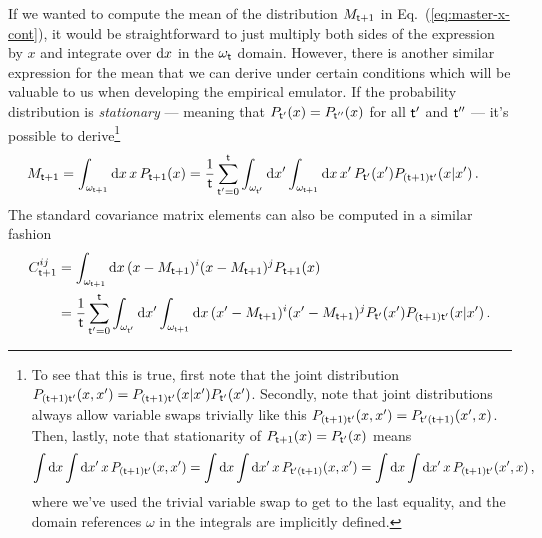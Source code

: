 If we wanted to compute the mean of the distribution $M_{{\sf t}+1}$ in Eq.~(\ref{eq:master-x-cont}), it would be straightforward to just multiply both sides of the expression by $x$ and integrate over ${\rm d}x$ in the $\omega_{{\sf t}}$ domain. However, there is another similar expression for the mean that we can derive under certain conditions which will be valuable to us when developing the empirical emulator. If the probability distribution is \emph{stationary} --- meaning that $P_{{\sf t}'}(x)=P_{{\sf t}''}(x)$ for all ${\sf t}'$ and ${\sf t}''$ --- it's possible to derive\footnote{To see that this is true, first note that the joint distribution $P_{({\sf t}+1){\sf t}'}(x,x')=P_{({\sf t}+1){\sf t}'}(x\vert x')P_{{\sf t}'}(x')$. Secondly, note that joint distributions always allow variable swaps trivially like this $P_{({\sf t}+1){\sf t}'}(x,x')=P_{{\sf t}'({\sf t}+1)}(x',x)$. Then, lastly, note that stationarity of $P_{{\sf t}+1}(x)=P_{{\sf t}'}(x)$ means 
$$\int {\rm d}x\int {\rm d}x' \, x\,P_{({\sf t}+1){\sf t}'}(x,x')=\int {\rm d}x\int {\rm d}x'  \, x\, P_{{\sf t}'({\sf t}+1)}(x,x')=\int {\rm d}x\int {\rm d}x'  \, x\, P_{({\sf t}+1){\sf t}'}(x',x)\,,$$
where we've used the trivial variable swap to get to the last equality, and the domain references $\omega$ in the integrals are implicitly defined.} 
\begin{align}
M_{{\sf t}+1} = \int_{\omega_{{\sf t}+1}}{\rm d}x \,x\,P_{{\sf t}+1}(x) &= \frac{1}{{\sf t}}\sum_{{\sf t}'=0}^{{\sf t}}\int_{\omega_{{\sf t}'}}{\rm d}x'\int_{\omega_{{\sf t}+1}}{\rm d}x \, x' \, P_{{\sf t}'}(x') P_{({\sf t}+1){\sf t}'}(x\vert x') \label{eq:stationary-mean-estimator}\,.
\end{align}
The standard covariance matrix elements can also be computed in a similar fashion
\begin{align}
C^{ij}_{{\sf t}+1} &= \int_{\omega_{{\sf t}+1}}{\rm d}x \,(x-M_{{\sf t}+1})^i(x-M_{{\sf t}+1})^jP_{{\sf t}+1}(x) \nonumber \\
&= \frac{1}{{\sf t}}\sum_{{\sf t}'=0}^{{\sf t}}\int_{\omega_{{\sf t}'}}{\rm d}x'\int_{\omega_{{\sf t}+1}}{\rm d}x \, (x'-M_{{\sf t}+1})^i(x'-M_{{\sf t}+1})^j P_{{\sf t}'}(x') P_{({\sf t}+1){\sf t}'}(x\vert x') \label{eq:stationary-covariance-estimator}\,.
\end{align}

